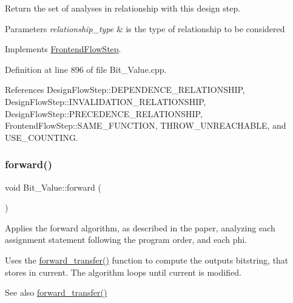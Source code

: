 Return the set of analyses in relationship with this design step. 


\begin{DoxyParams}{Parameters}
{\em relationship\+\_\+type} & is the type of relationship to be considered \\
\hline
\end{DoxyParams}


Implements \hyperlink{classFrontendFlowStep_abeaff70b59734e462d347ed343dd700d}{Frontend\+Flow\+Step}.



Definition at line 896 of file Bit\+\_\+\+Value.\+cpp.



References Design\+Flow\+Step\+::\+D\+E\+P\+E\+N\+D\+E\+N\+C\+E\+\_\+\+R\+E\+L\+A\+T\+I\+O\+N\+S\+H\+IP, Design\+Flow\+Step\+::\+I\+N\+V\+A\+L\+I\+D\+A\+T\+I\+O\+N\+\_\+\+R\+E\+L\+A\+T\+I\+O\+N\+S\+H\+IP, Design\+Flow\+Step\+::\+P\+R\+E\+C\+E\+D\+E\+N\+C\+E\+\_\+\+R\+E\+L\+A\+T\+I\+O\+N\+S\+H\+IP, Frontend\+Flow\+Step\+::\+S\+A\+M\+E\+\_\+\+F\+U\+N\+C\+T\+I\+ON, T\+H\+R\+O\+W\+\_\+\+U\+N\+R\+E\+A\+C\+H\+A\+B\+LE, and U\+S\+E\+\_\+\+C\+O\+U\+N\+T\+I\+NG.

\mbox{\label{classBit__Value_ade90e85e32dd5a1c2c4d11c221a69fd2}} 
\subsubsection{\texorpdfstring{forward()}{forward()}}
{\footnotesize\ttfamily void Bit\+\_\+\+Value\+::forward (\begin{DoxyParamCaption}{ }\end{DoxyParamCaption})\hspace{0.3cm}{\ttfamily [private]}}



Applies the forward algorithm, as described in the paper, analyzing each assignment statement following the program order, and each phi. 

Uses the \hyperlink{classBit__Value_abe0b4a87f9114bc82818b51dbdf0aca7}{forward\+\_\+transfer()} function to compute the output\textquotesingle{}s bitstring, that stores in current. The algorithm loops until current is modified. \begin{DoxySeeAlso}{See also}
\hyperlink{classBit__Value_abe0b4a87f9114bc82818b51dbdf0aca7}{forward\+\_\+transfer()} 
\end{DoxySeeAlso}


